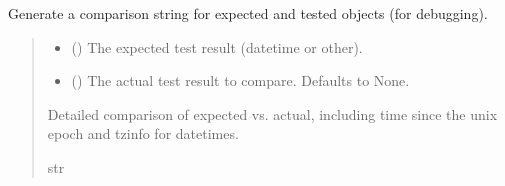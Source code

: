 \documentclass[letterpaper,10pt,english]{sphinxmanual}
\begin{document}
\begin{fulllineitems}
\label{\detokenize{apache_commons_validator_python.util:apache_commons_validator_python.util.datetime_helpers.obj_to_str}}
\pysigstartsignatures
{}
\pysigstopsignatures
\sphinxAtStartPar
Generate a comparison string for expected and tested objects (for debugging).
\begin{quote}\begin{description}
\begin{itemize}
\item {} 
\sphinxAtStartPar
{} () \textendash{} The expected test result (datetime or other).

\item {} 
\sphinxAtStartPar
{} (\sphinxstyleliteralemphasis{\sphinxupquote{, }}) \textendash{} The actual test result to compare. Defaults to None.

\end{itemize}

\sphinxAtStartPar
Detailed comparison of expected vs. actual, including time since the unix epoch and tzinfo for datetimes.

\sphinxAtStartPar
str

\end{description}\end{quote}

\end{fulllineitems}

\end{document}
